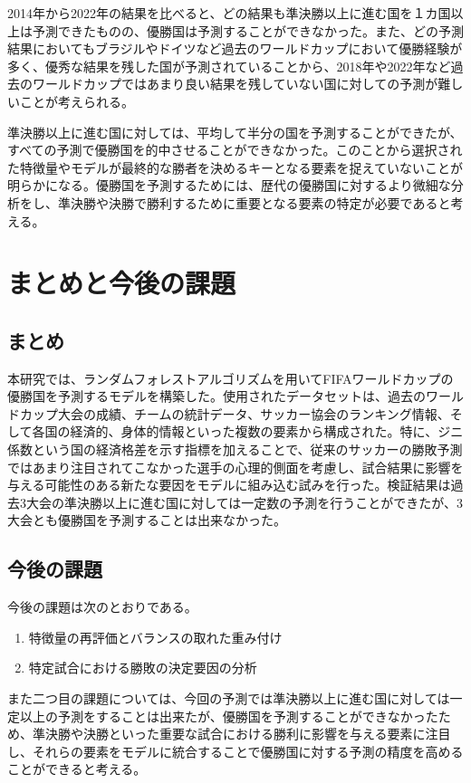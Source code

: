 \documentclass[platex]{suribt}
\begin{document}
2014年から2022年の結果を比べると、どの結果も準決勝以上に進む国を１カ国以上は予測できたものの、優勝国は予測することができなかった。また、どの予測結果においてもブラジルやドイツなど過去のワールドカップにおいて優勝経験が多く、優秀な結果を残した国が予測されていることから、2018年や2022年など過去のワールドカップではあまり良い結果を残していない国に対しての予測が難しいことが考えられる。

準決勝以上に進む国に対しては、平均して半分の国を予測することができたが、すべての予測で優勝国を的中させることができなかった。このことから選択された特徴量やモデルが最終的な勝者を決めるキーとなる要素を捉えていないことが明らかになる。優勝国を予測するためには、歴代の優勝国に対するより微細な分析をし、準決勝や決勝で勝利するために重要となる要素の特定が必要であると考える。

\chapter{まとめと今後の課題}

\section{まとめ}
本研究では、ランダムフォレストアルゴリズムを用いてFIFAワールドカップの優勝国を予測するモデルを構築した。使用されたデータセットは、過去のワールドカップ大会の成績、チームの統計データ、サッカー協会のランキング情報、そして各国の経済的、身体的情報といった複数の要素から構成された。特に、ジニ係数という国の経済格差を示す指標を加えることで、従来のサッカーの勝敗予測ではあまり注目されてこなかった選手の心理的側面を考慮し、試合結果に影響を与える可能性のある新たな要因をモデルに組み込む試みを行った。検証結果は過去3大会の準決勝以上に進む国に対しては一定数の予測を行うことができたが、3大会とも優勝国を予測することは出来なかった。
\section{今後の課題}
今後の課題は次のとおりである。

\begin{enumerate}
  \item 特徴量の再評価とバランスの取れた重み付け
  \item 特定試合における勝敗の決定要因の分析
\end{enumerate}



また二つ目の課題については、今回の予測では準決勝以上に進む国に対しては一定以上の予測をすることは出来たが、優勝国を予測することができなかったため、準決勝や決勝といった重要な試合における勝利に影響を与える要素に注目し、それらの要素をモデルに統合することで優勝国に対する予測の精度を高めることができると考える。
\end{document}
